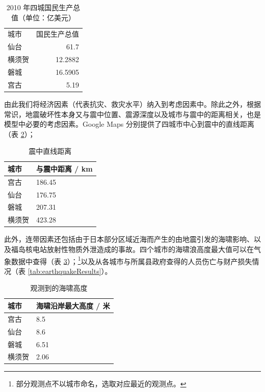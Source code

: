 \documentclass[UTF8]{ctexart}
\begin{document}
\begin{table}[htbp]
  \caption{2010 年四城国民生产总值（单位：亿美元）}
  \label{tab:sample}
  \centering
  \begin{tabular}{lr}
    城市 & 国民生产总值 \\
    仙台 & 61.7 \\
    横须贺 & 12.2882 \\
    磐城 & 16.5905 \\
    宫古 & 5.19
  \end{tabular}
\end{table}

由此我们将经济因素（代表抗灾、救灾水平）纳入到考虑因素中。除此之外，根据常识，地震破坏性本身又与震中位置、震源深度以及城市与震中的距离相关，也是模型中必要的考虑因素。Google Maps 分别提供了四城市中心到震中的直线距离（表 \ref{tab:distanceToCenter}）；

\begin{table}[htbp]
  \centering
  \caption{震中直线距离}
  \label{tab:distanceToCenter}
  \begin{tabular}{ll}
    \hline
    城市  & 与震中距离 / km \\ \hline
    宫古  & 186.45     \\
    仙台  & 176.75     \\
    磐城  & 207.31     \\
    横须贺 & 423.28     \\ \hline
  \end{tabular}
\end{table}

此外，连带因素还包括由于日本部分区域近海而产生的由地震引发的海啸影响、以及福岛核电站放射性物质外泄造成的事故。四个城市的海啸浪高度最大值可以在气象数据中查得\cite{JMA2011TsunamiHeight}\cite{JMATsunamiSites}（表 \ref{tab:tsunamiHeight}）；\footnote{部分观测点不以城市命名，选取对应最近的观测点。}以及从各城市与所属县政府查得的人员伤亡与财产损失情况（表 \ref{tab:earthquakeResults}）\cite{Miyako2015EarthquakeTsunamiRecord}\cite{仙台市役所2017Report}\cite{いわき市役所2015災害対策本部週報}\cite{横須賀市2011東日本大震災関連情報}。

\begin{table}[htbp]{}
  \centering
  \caption{观测到的海啸高度}
  \label{tab:tsunamiHeight}
  \begin{tabular}{ll}
    \hline
    城市  & 海啸沿岸最大高度 / 米 \\ \hline
    宫古  & 8.5          \\
    仙台  & 8.6          \\
    磐城  & 6.51         \\
    横须贺 & 2.06         \\ \hline
  \end{tabular}
\end{table}
\end{document}
